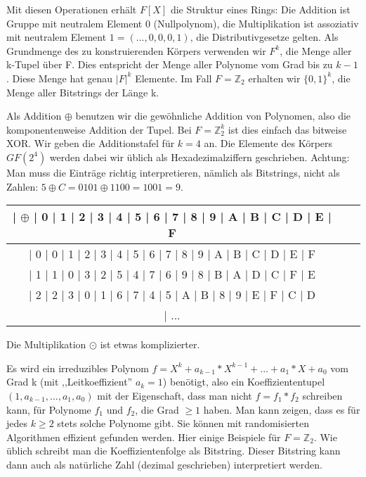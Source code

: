\documentclass[a4paper]{article}
\begin{document}
\begin{multicols}{3}
    Mit diesen Operationen erhält $F[X]$ die Struktur eines Rings: Die Addition ist Gruppe mit neutralem Element 0 (Nullpolynom), die Multiplikation ist assoziativ mit neutralem Element $1=(...,0,0,0,1)$, die Distributivgesetze gelten.
    Als Grundmenge des zu konstruierenden Körpers verwenden wir $F^k$, die Menge aller k-Tupel über F. Dies entspricht der Menge aller Polynome vom Grad bis zu $k-1$. Diese Menge hat genau $|F|^k$ Elemente. Im Fall $F=\mathbb{Z}_2$ erhalten wir $\{0,1\}^k$, die Menge aller Bitstrings der Länge k.

    Als Addition $\oplus$ benutzen wir die gewöhnliche Addition von Polynomen, also die komponentenweise Addition der Tupel. Bei $F=\mathbb{Z}^k_2$ ist dies einfach das bitweise XOR. Wir geben die Additionstafel für $k=4$ an. Die Elemente des Körpers $GF(2^4)$ werden dabei wir üblich als Hexadezimalziffern geschrieben. Achtung: Man muss die Einträge richtig interpretieren, nämlich als Bitstrings, nicht als Zahlen: $5\oplus C=0101\oplus 1100=1001=9$.

    \begin{tabular}{c|c|c}
    | $\oplus$ | 0  | 1  | 2  | 3  | 4  | 5  | 6  | 7  | 8  | 9  | A  | B  | C  | D  | E  | F \\\hline
    | 0    | 0  | 1  | 2  | 3  | 4  | 5  | 6  | 7  | 8  | 9  | A  | B  | C  | D  | E  | F \\
    | 1    | 1  | 0  | 3  | 2  | 5  | 4  | 7  | 6  | 9  | 8  | B  | A  | D  | C  | F  | E \\
    | 2    | 2  | 3  | 0  | 1  | 6  | 7  | 4  | 5  | A  | B  | 8  | 9  | E  | F  | C  | D \\
    | ...   
    \end{tabular}

    Die Multiplikation $\odot$ ist etwas komplizierter.

    Es wird ein irreduzibles Polynom $f=X^k+a_{k-1}* X^{k-1}+...+a_1*X+a_0$ vom Grad k (mit ,,Leitkoeffizient'' $a_k=1$) benötigt, also ein Koeffiziententupel $(1,a_{k-1},...,a_1,a_0)$ mit der Eigenschaft, dass man nicht $f=f_1*f_2$ schreiben kann, für Polynome $f_1$ und $f_2$, die Grad $\geq 1$ haben. Man kann zeigen, dass es für jedes $k\geq 2$ stets solche Polynome gibt. Sie können mit randomisierten Algorithmen effizient gefunden werden. Hier einige Beispiele für $F=\mathbb{Z}_2$. Wie üblich schreibt man die Koeffizientenfolge als Bitstring. Dieser Bitstring kann dann auch als natürliche Zahl (dezimal geschrieben) interpretiert werden.


\end{multicols}
\end{document}
